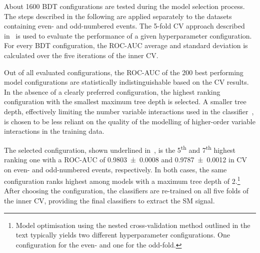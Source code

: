 About 1600 BDT configurations are tested during the model selection process. The
steps described in the following are applied separately to the datasets
containing even- and odd-numbered events. The 5-fold CV approach described
in~ is used to evaluate the performance of a given
hyperparameter configuration. For every BDT configuration, the ROC-AUC average
and standard deviation is calculated over the five iterations of the inner CV.

Out of all evaluated configurations, the ROC-AUC of the 200 best performing
model configurations are statistically indistinguishable based on the CV
results. In the absence of a clearly preferred configuration, the highest
ranking configuration with the smallest maximum tree depth is selected. A
smaller tree depth, effectively limiting the number variable interactions used
in the classifier~\cite{hastie09}, is chosen to be less reliant on the quality
of the modelling of higher-order variable interactions in the training data.

The selected configuration, shown underlined
in~, is the 5\textsuperscript{th}
and 7\textsuperscript{th} highest ranking one with a ROC-AUC of
\num{0.9803 +- 0.0008} and \num{0.9787 +- 0.0012} in CV on even- and
odd-numbered events, respectively. In both cases, the same
configuration ranks highest among models with a maximum tree depth of
2.\footnote{Model optimisation using the nested cross-validation
  method outlined in the text typically yields two different
  hyperparameter configurations. One configuration for the even- and
  one for the odd-fold.} After choosing the configuration, the
classifiers are re-trained on all five folds of the inner CV,
providing the final classifiers to extract the SM \HH signal.




